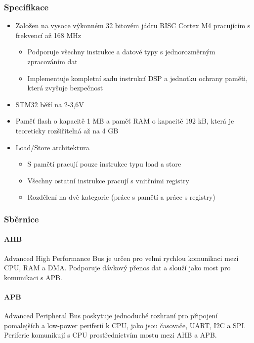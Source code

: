 \subsubsection{Specifikace}
\begin{itemize}
    \item Založen na vysoce výkonném 32 bitovém jádru RISC Cortex M4 pracujícím s frekvencí až 168 MHz
    \begin{itemize}
        \item Podporuje všechny instrukce a datové typy s jednorozměrným zpracováním dat
        \item Implementuje kompletní sadu instrukcí DSP a jednotku ochrany paměti, která zvyšuje bezpečnost
    \end{itemize}
    \item STM32 běží na 2-3,6V
    \item Paměť flash o kapacitě 1 MB a paměť RAM o kapacitě 192 kB, která je teoreticky rozšiřitelná až na 4 GB
    \item Load/Store architektura
    \begin{itemize}
        \item S pamětí pracují pouze instrukce typu load a store
        \item Všechny ostatní instrukce pracují s vnitřními registry
        \item Rozdělení na dvě kategorie (práce s pamětí a práce s registry)
    \end{itemize}
\end{itemize}

\subsubsection{Sběrnice}

\paragraph{AHB} Advanced High Performance Bus je určen pro velmi rychlou komunikaci mezi CPU, RAM a DMA. Podporuje dávkový přenos dat a slouží jako most pro komunikaci s APB.

\paragraph{APB} Advanced Peripheral Bus poskytuje jednoduché rozhraní pro připojení pomalejších a low-power periferií k CPU, jako jsou časovače, UART, I2C a SPI. Periferie komunikují s CPU prostřednictvím mostu mezi AHB a APB.

